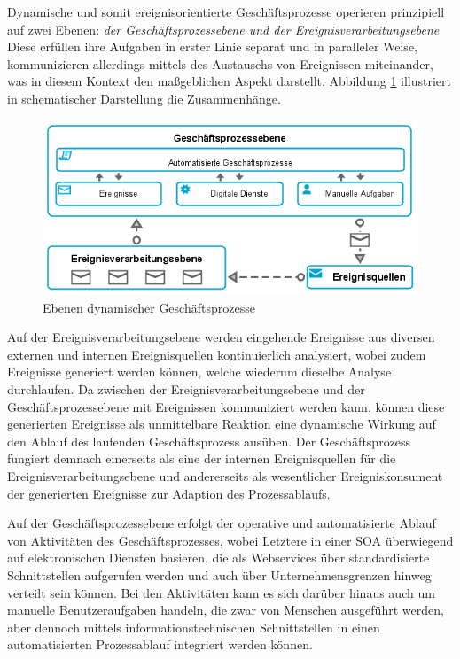 Dynamische und somit ereignisorientierte Geschäftsprozesse operieren prinzipiell auf zwei Ebenen: \textit{der Geschäftsprozessebene und der Ereignisverarbeitungsebene}
Diese erfüllen ihre Aufgaben in erster Linie separat und in paralleler Weise, kommunizieren allerdings mittels des Austauschs von Ereignissen miteinander, was in diesem Kontext den maßgeblichen Aspekt darstellt. 
Abbildung \ref{fig:Ebenen dynamischer Geschäftsprozesse} illustriert in schematischer Darstellung die Zusammenhänge.

\begin{figure}[H]
	\centering 
    \includegraphics[width=\textwidth]{img/dynamicbp.png}	
    \caption[Ebenen dynamischer Geschäftsprozesse]
    {Ebenen dynamischer Geschäftsprozesse \protect\footnotemark}
    \label{fig:Ebenen dynamischer Geschäftsprozesse}
\end{figure}

Auf der Ereignisverarbeitungsebene werden eingehende Ereignisse aus diversen externen und internen Ereignisquellen kontinuierlich analysiert, wobei zudem Ereignisse generiert werden können, welche wiederum dieselbe Analyse durchlaufen. 
Da zwischen der Ereignisverarbeitungsebene und der Geschäftsprozessebene mit Ereignissen kommuniziert werden kann, können diese generierten Ereignisse als unmittelbare Reaktion eine dynamische Wirkung auf den Ablauf des laufenden Geschäftsprozess ausüben.
Der Geschäftsprozess fungiert demnach einerseits als eine der internen Ereignisquellen für die Ereignisverarbeitungsebene und andererseits als wesentlicher Ereigniskonsument der generierten Ereignisse zur Adaption des Prozessablaufs.
\cite{Benker.2016}

Auf der Geschäftsprozessebene erfolgt der operative und automatisierte Ablauf von Aktivitäten des Geschäftsprozesses, wobei Letztere in einer \ac{SOA} überwiegend auf elektronischen Diensten basieren, die als Webservices über standardisierte Schnittstellen aufgerufen werden und auch über Unternehmensgrenzen hinweg verteilt sein können.
\cite{Finger.2009}
Bei den Aktivitäten kann es sich darüber hinaus auch um manuelle Benutzeraufgaben handeln, die zwar von Menschen ausgeführt werden, aber dennoch mittels informationstechnischen Schnittstellen in einen automatisierten Prozessablauf integriert werden können.
\cite{Bruns.2010}


